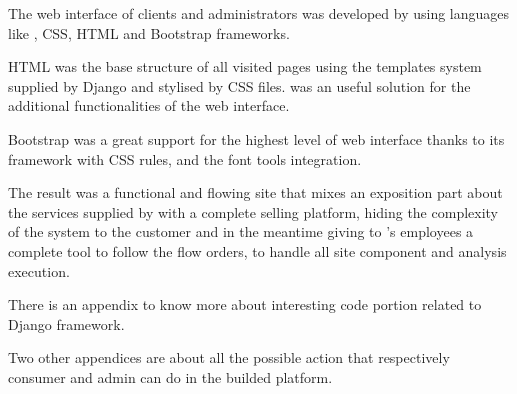 \documentclass[12pt,a4paper]{scrartcl}
\begin{document}
The web interface of clients and administrators was developed by using languages like {\js}, CSS, HTML and Bootstrap frameworks.

HTML was the base structure of all visited pages using the templates system supplied by Django and stylised by CSS files. {\js} was an useful solution for the additional functionalities of the web interface.

Bootstrap was a great support for the highest level of web interface thanks to its framework with CSS rules, {\js} and the font tools integration.

The result was a functional and flowing site that mixes an exposition part about the services supplied by {\fem} with a complete selling platform, hiding the complexity of the system to the customer and in the meantime giving to {\fem}’s employees a complete tool to follow the flow orders, to handle all site component and analysis execution.

There is an appendix to know more about interesting code portion related to Django framework.

Two other appendices are about all the possible action that respectively consumer and admin can do in the builded platform.
\end{document}
